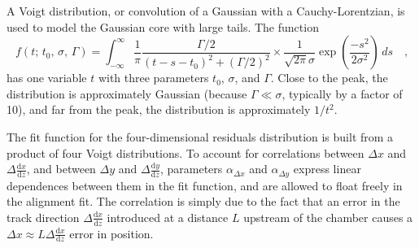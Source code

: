 \documentclass[11pt,twoside,a4paper,cmspaper]{cms-tdr}
\begin{document}
A Voigt distribution, or convolution of a Gaussian with a
Cauchy-Lorentzian, is used to model the Gaussian core with large tails.
The function
\begin{equation}
f(t; \, t_0, \, \sigma, \, \Gamma) = \int_{-\infty}^\infty
\frac{1}{\pi}\frac{\Gamma/2}{(t - s - t_0)^2 + (\Gamma/2)^2} \times
\frac{1}{\sqrt{2\pi} \sigma} \exp\left(\frac{-s^2}{2
  \sigma^2}\right) \, ds\quad\mbox{,}
\label{eqn:fitfunction}
\end{equation}
has one variable $t$ with three parameters $t_0$, $\sigma$,
and $\Gamma$.  Close to the peak, the distribution is approximately
Gaussian (because $\Gamma \ll \sigma$, typically by a factor of 10), and far from the
peak, the distribution is approximately $1/t^2$.

The fit function for the four-dimensional residuals distribution is
built from a product of four Voigt distributions.  To account for
correlations between $\Delta x$ and $\Delta \frac{\textrm{d}x}{\textrm{d}z}$, and
between $\Delta y$ and $\Delta \frac{\textrm{d}y}{\textrm{d}z}$, parameters
$\alpha_{\Delta x}$ and $\alpha_{\Delta y}$ express linear dependences between
them in the fit function, and are allowed to float freely in the alignment fit.
The correlation is simply due to the fact that an
error in the track direction $\Delta \frac{\textrm{d}x}{\textrm{d}z}$ introduced at a
distance $L$ upstream of the chamber causes a $\Delta x \approx
L \Delta \frac{\textrm{d}x}{\textrm{d}z}$ error in position.
\end{document}
